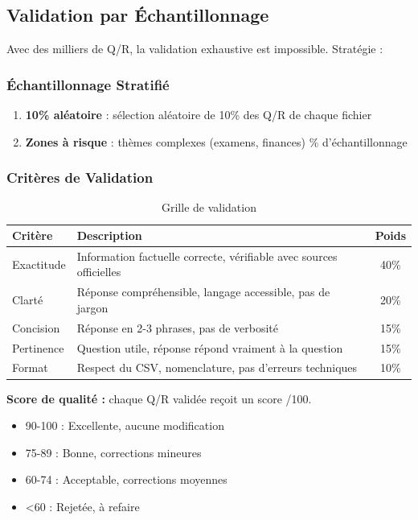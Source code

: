 \documentclass[11pt,a4paper]{article}
\begin{document}
\subsection{Validation par Échantillonnage}
Avec des milliers de Q/R, la validation exhaustive est impossible. Stratégie :

\subsubsection{Échantillonnage Stratifié}
\begin{enumerate}
    \item \textbf{10\% aléatoire} : sélection aléatoire de 10\% des Q/R de chaque fichier
    \item \textbf{Zones à risque} : thèmes complexes (examens, finances) \% d'échantillonnage
\end{enumerate}

\subsubsection{Critères de Validation}
\begin{table}[H]
    \centering
    \begin{tabularx}{\textwidth}{|l|X|c|}
        \hline
        \textbf{Critère} & \textbf{Description} & \textbf{Poids} \\
        \hline
        Exactitude & Information factuelle correcte, vérifiable avec sources officielles & 40\% \\
        \hline
        Clarté & Réponse compréhensible, langage accessible, pas de jargon & 20\% \\
        \hline
        Concision & Réponse en 2-3 phrases, pas de verbosité & 15\% \\
        \hline
        Pertinence & Question utile, réponse répond vraiment à la question & 15\% \\
        \hline
        Format & Respect du CSV, nomenclature, pas d'erreurs techniques & 10\% \\
        \hline
    \end{tabularx}
    \caption{Grille de validation}
\end{table}

\textbf{Score de qualité :} chaque Q/R validée reçoit un score /100.
\begin{itemize}
    \item 90-100 : Excellente, aucune modification
    \item 75-89 : Bonne, corrections mineures
    \item 60-74 : Acceptable, corrections moyennes
    \item <60 : Rejetée, à refaire
\end{itemize}
\end{document}
